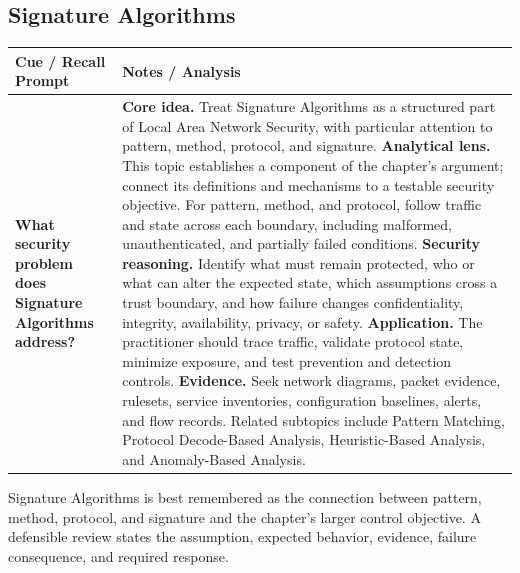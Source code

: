 \documentclass[11pt]{article}
\newcommand{\CornellHeader}{%
\rowcolor{Navy}\color{white}\bfseries Cue / Recall Prompt & \color{white}\bfseries Notes / Analysis\\\hline}
\newcommand{\CornellRow}[2]{%
\cellcolor{CueGray}\RaggedRight\textbf{#1} & \RaggedRight #2\\\hline}
\begin{document}
\subsection*{Signature Algorithms}
\begin{longtable}{>{\RaggedRight\arraybackslash}p{}|>{\RaggedRight\arraybackslash}p{}}
\CornellHeader
\CornellRow{What security problem does Signature Algorithms address?}{\textbf{Core idea.} Treat Signature Algorithms as a structured part of Local Area Network Security, with particular attention to pattern, method, protocol, and signature. \textbf{Analytical lens.} This topic establishes a component of the chapter's argument; connect its definitions and mechanisms to a testable security objective. For pattern, method, and protocol, follow traffic and state across each boundary, including malformed, unauthenticated, and partially failed conditions. \textbf{Security reasoning.} Identify what must remain protected, who or what can alter the expected state, which assumptions cross a trust boundary, and how failure changes confidentiality, integrity, availability, privacy, or safety. \textbf{Application.} The practitioner should trace traffic, validate protocol state, minimize exposure, and test prevention and detection controls. \textbf{Evidence.} Seek network diagrams, packet evidence, rulesets, service inventories, configuration baselines, alerts, and flow records. Related subtopics include Pattern Matching, Protocol Decode-Based Analysis, Heuristic-Based Analysis, and Anomaly-Based Analysis.}
\end{longtable}
\begin{topicsummary}
Signature Algorithms is best remembered as the connection between pattern, method, protocol, and signature and the chapter's larger control objective. A defensible review states the assumption, expected behavior, evidence, failure consequence, and required response.
\end{topicsummary}
\end{document}
